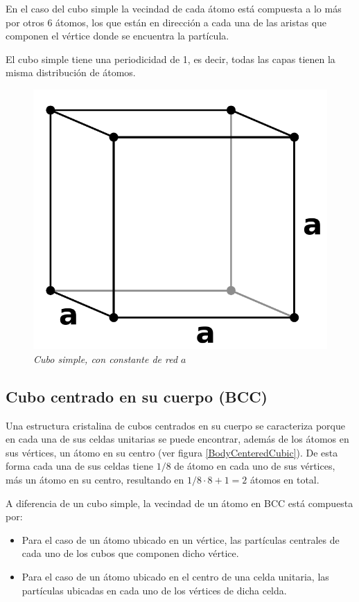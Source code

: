 En el caso del cubo simple la vecindad de cada átomo está compuesta a lo más por otros 6 átomos, los que están en dirección a cada una de las aristas que componen el vértice donde se encuentra la partícula.

El cubo simple tiene una periodicidad de 1, es decir, todas las capas tienen la misma distribución de átomos.

\begin{figure}[ht]
  \centering
  \includegraphics[scale=.6]{images/SimpleCubic}
  \caption{\em Cubo simple, con constante de red $a$}
  \label{SimpleCubic}
\end{figure}


\subsection{Cubo centrado en su cuerpo (BCC)}
\label{structureBCC}
Una estructura cristalina de cubos centrados en su cuerpo se caracteriza porque en cada una de sus celdas unitarias se puede encontrar, además de los átomos en sus vértices, un átomo en su centro (ver figura \ref{BodyCenteredCubic}). De esta forma cada una de sus celdas tiene $1/8$ de átomo en cada uno de sus vértices, más un átomo en su centro, resultando en $1/8 \cdot 8 + 1 = 2$ átomos en total.

A diferencia de un cubo simple, la vecindad de un átomo en BCC está compuesta por:

\begin{itemize}
  \item Para el caso de un átomo ubicado en un vértice, las partículas centrales de cada uno de los cubos que componen dicho vértice.
  \item Para el caso de un átomo ubicado en el centro de una celda unitaria, las partículas ubicadas en cada uno de los vértices de dicha celda.
\end{itemize}

